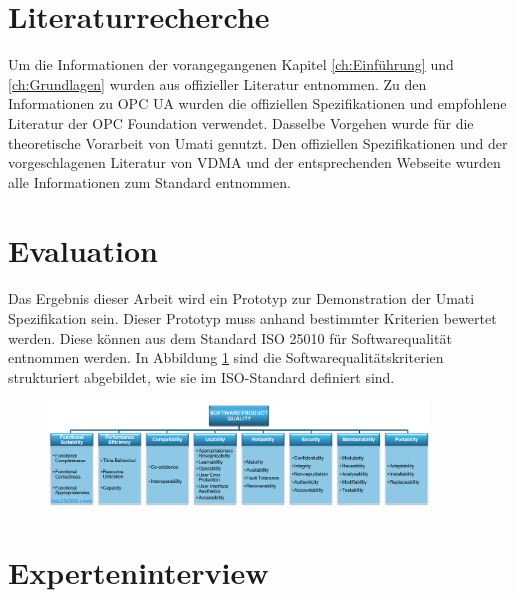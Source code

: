 \documentclass[a4paper, 12pt, oneside]{scrbook}
\begin{document}
	\section{Literaturrecherche}
	
	Um die Informationen der vorangegangenen Kapitel \ref{ch:Einführung} und \ref{ch:Grundlagen} wurden aus offizieller Literatur entnommen. Zu den Informationen zu OPC UA wurden die offiziellen Spezifikationen und empfohlene Literatur der OPC Foundation verwendet. Dasselbe Vorgehen wurde für die theoretische Vorarbeit von Umati genutzt. Den offiziellen Spezifikationen und der vorgeschlagenen Literatur von VDMA und der entsprechenden Webseite wurden alle Informationen zum Standard entnommen.
	
	
	
	\section{Evaluation}
	
	
	Das Ergebnis dieser Arbeit wird ein Prototyp zur Demonstration der Umati Spezifikation sein. Dieser Prototyp muss anhand bestimmter Kriterien bewertet werden. Diese können aus dem Standard ISO 25010 für Softwarequalität entnommen werden. In Abbildung \ref{fig:ISO25010} sind die Softwarequalitätskriterien strukturiert abgebildet, wie sie im ISO-Standard definiert sind. 
	
	\begin{figure}[H]
		\centering
		\includegraphics[width=0.9\textwidth]{res/diagramms/iso25010.png}
		\caption{} 
		\label{fig:ISO25010}
	\end{figure}
	
	
	
	
	\section{Experteninterview}
	
\end{document}
